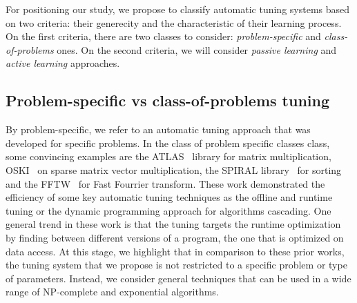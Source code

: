\documentclass[10pt, conference, compsocconf]{IEEEtran}
\begin{document}
For positioning our study, we propose to classify automatic tuning systems based on two criteria: 
their generecity and the characteristic of their learning process. On the first criteria, there are two classes to consider: 
{\it problem-specific} and {\it class-of-problems} ones. On the second criteria, we will consider 
{\it passive learning} and {\it active  learning} approaches.

\subsection{Problem-specific vs class-of-problems tuning}

By problem-specific, we refer to an automatic tuning approach that was developed for specific problems. 
In the class of problem specific classes class, some convincing examples are the ATLAS~\cite{ATLAS} library for matrix multiplication, 
OSKI~\cite{Vuduc:2005zi} on sparse matrix vector multiplication,  the SPIRAL library~\cite{Spiral} for sorting and the FFTW~\cite{FFTW}  
for Fast Fourrier transform. These work demonstrated the efficiency of some key automatic tuning techniques as the offline and  
 runtime tuning or the dynamic programming approach for algorithms cascading. One general trend in these work is that 
the tuning targets the runtime optimization by finding between different versions of a program, the one that is optimized on data 
access. At this stage, we highlight that in comparison to these prior works, the tuning system that we propose is not restricted to 
a specific problem or type of parameters. Instead, we consider general 
techniques that can be used in a wide range of NP-complete and exponential algorithms.
\end{document}
